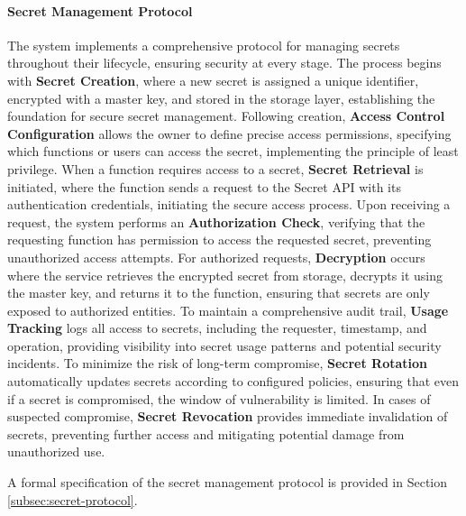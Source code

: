 \documentclass[12pt,a4paper]{article}
\begin{document}
\paragraph{Secret Management Protocol}
The system implements a comprehensive protocol for managing secrets throughout their lifecycle, ensuring security at every stage. The process begins with \textbf{Secret Creation}, where a new secret is assigned a unique identifier, encrypted with a master key, and stored in the storage layer, establishing the foundation for secure secret management. Following creation, \textbf{Access Control Configuration} allows the owner to define precise access permissions, specifying which functions or users can access the secret, implementing the principle of least privilege. When a function requires access to a secret, \textbf{Secret Retrieval} is initiated, where the function sends a request to the Secret API with its authentication credentials, initiating the secure access process. Upon receiving a request, the system performs an \textbf{Authorization Check}, verifying that the requesting function has permission to access the requested secret, preventing unauthorized access attempts. For authorized requests, \textbf{Decryption} occurs where the service retrieves the encrypted secret from storage, decrypts it using the master key, and returns it to the function, ensuring that secrets are only exposed to authorized entities. To maintain a comprehensive audit trail, \textbf{Usage Tracking} logs all access to secrets, including the requester, timestamp, and operation, providing visibility into secret usage patterns and potential security incidents. To minimize the risk of long-term compromise, \textbf{Secret Rotation} automatically updates secrets according to configured policies, ensuring that even if a secret is compromised, the window of vulnerability is limited. In cases of suspected compromise, \textbf{Secret Revocation} provides immediate invalidation of secrets, preventing further access and mitigating potential damage from unauthorized use.

A formal specification of the secret management protocol is provided in Section \ref{subsec:secret-protocol}.


\end{document}
